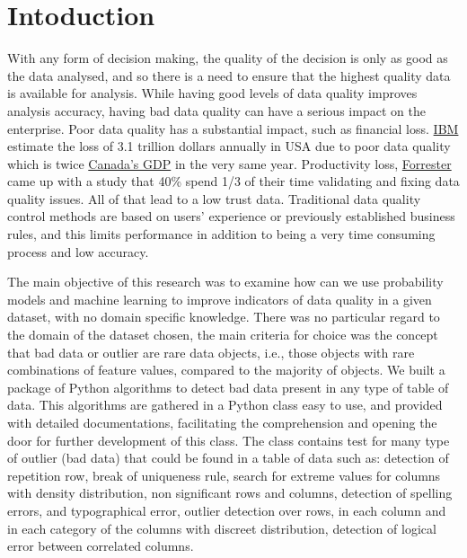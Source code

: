 \documentclass{article}
\begin{document}
\section{Intoduction} %
\label{sec:Intoduction}
With any form of decision making, the quality of the decision is only as good as the data analysed, and so there is a need to ensure that the highest quality data is available for analysis. While having good levels of data quality improves analysis accuracy, having bad data quality can have a serious impact on the enterprise.
Poor data quality has a substantial impact, such as financial loss.  \href{https://www.ibm.com/blogs/journey-to-ai/}{IBM} estimate the loss of 3.1 trillion dollars annually  in USA due to poor data quality which is twice \href{https://data.worldbank.org/indicator/NY.GDP.MKTP.CD}{Canada’s GDP} in the very same year. Productivity loss, \href{https://www.forrester.com/report/Build-Trusted-Data-With-Data-Quality/RES83344}{Forrester} came up with a study that 40\% spend 1/3 of their time validating and fixing data quality issues. All of that lead to a low trust data.
Traditional data quality control methods are based on users’ experience or previously established business rules, and this
limits performance in addition to being a very time consuming process and low accuracy.

The main objective of this research was to examine how can we use
probability models and machine learning to improve indicators
of data quality in a given dataset, with no domain specific knowledge.
There was no particular regard to the domain of the dataset chosen, the main criteria for choice was the concept that bad data or outlier are rare data objects, i.e., those objects with rare combinations of feature values, compared to the majority of objects.
We built a package of Python algorithms to detect bad data present in any type of table of data. This algorithms are gathered in a Python class easy to use, and provided with detailed documentations, facilitating the comprehension and opening the door for further development of this class. The class contains test for many type of outlier (bad data) that could be found in a table of data such as: detection of repetition row, break of uniqueness rule, search for extreme values for columns with density distribution, non significant rows and columns, detection of spelling errors, and typographical error, outlier detection over rows, in each column and in each category of the columns with discreet distribution, detection of logical error between correlated columns.
\end{document}
